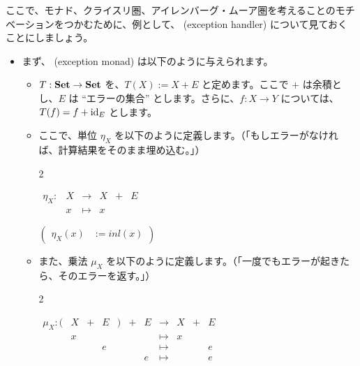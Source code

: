 \documentclass[
		head_space=20mm,
		foot_space=20mm,
		gutter=10mm,
		line_length=190mm
]{jlreq}
\begin{document}
	


\clearpage

\noindent 
ここで、モナド、クライスリ圏、アイレンバーグ・ムーア圏を考えることのモチベーションをつかむために、例として、 (exception handler) について見ておくことにしましょう。%
\begin{oframed}
\begin{itemize}
	\item まず、 (exception monad) は以下のように与えられます。
	\begin{itemize}
		\item $T:\mathbf{Set}\to\mathbf{Set}$ を、$T(X):=X+E$ と定めます。ここで $+$ は余積とし、$E$ は ``エラーの集合'' とします。さらに、$f:X\to Y$ については、$T(f)=f+\mathrm{id}_E$ とします。
		\item ここで、単位 $\eta_X$ を以下のように定義します。（「もしエラーがなければ、計算結果をそのまま埋め込む。」）
		\begin{multicols}{2}
			\begin{center}
				$\begin{array}{cccccc}\eta_X:&X&\longrightarrow &X&+&E\\[2pt] & x & \mapsto & x\end{array}$
			\end{center}
			\begin{center} \small
				$\left(\begin{array}{cc}\eta_X(x)&:=inl(x)\end{array}\right)$
			\end{center}
		\end{multicols}
		\item また、乗法 $\mu_X$ を以下のように定義します。（「一度でもエラーが起きたら、そのエラーを返す。」）
		\begin{multicols}{2}
			\begin{center}
				$\begin{array}{ccccccccccc}\mu_X:({\!\!}&X&\!+\!&E&{\!\!})&\!+\!&E&\longrightarrow&X&\!+\!&E\\[-1pt] & x &&&&&&\mapsto &x\\[-3pt] &&& e &&&& \mapsto &&& e \\[-3pt]  &&&&&& e & \mapsto &&& e \end{array}$

\end{center}
\end{multicols}
\end{itemize}
\end{itemize}
\end{oframed}
\end{document}
